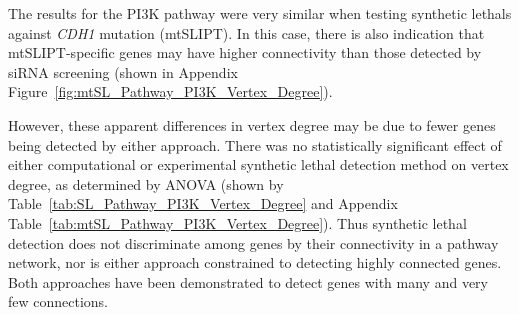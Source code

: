 \begin{table*}[!htb]
\caption{\acrshort{ANOVA} for synthetic lethality and vertex degree}
\label{tab:SL_Pathway_PI3K_Vertex_Degree}
\noindent{}
\end{table*} \filbreak

The results for the PI3K pathway were very similar when testing \glspl{synthetic lethal} against \textit{CDH1} \gls{mutation} (\acrshort{mtSLIPT}). In this case, there is also indication that \acrshort{mtSLIPT}-specific genes may have higher connectivity than those detected by \gls{siRNA} screening (shown in Appendix Figure~\ref{fig:mtSL_Pathway_PI3K_Vertex_Degree}).

However, these apparent differences in \gls{vertex} degree may be due to fewer genes being detected by either approach. There was no statistically significant effect of either computational or experimental \gls{synthetic lethal} detection method on \gls{vertex} degree, as determined by \gls{ANOVA} (shown by Table~\ref{tab:SL_Pathway_PI3K_Vertex_Degree} and Appendix Table~\ref{tab:mtSL_Pathway_PI3K_Vertex_Degree}). Thus \gls{synthetic lethal} detection does not discriminate among genes by their connectivity in a pathway network, nor is either approach constrained to detecting highly connected genes. Both approaches have been demonstrated to detect genes with many and very few connections.

